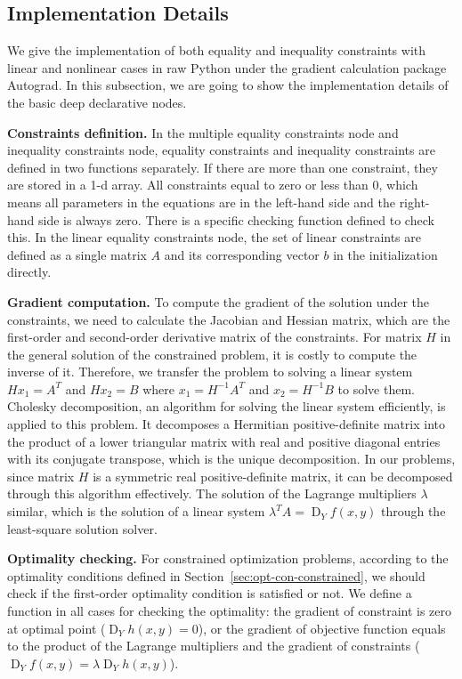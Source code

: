 \subsection{Implementation Details}
We give the implementation of both equality and inequality constraints with linear and nonlinear cases in raw Python under the gradient calculation package Autograd\citep{MD:15}. In this subsection, we are going to show the implementation details of the basic deep declarative nodes.
\par \textbf{Constraints definition.}  
In the multiple equality constraints node and inequality constraints node, equality constraints and inequality constraints are defined in two functions separately. If there are more than one constraint, they are stored in a 1-d array. All constraints equal to zero or less than 0, which means all parameters in the equations are in the left-hand side and the right-hand side is always zero. There is a specific checking function defined to check this. In the linear equality constraints node, the set of linear constraints are defined as a single matrix $A$ and its corresponding vector $b$ in the initialization directly. 

\par \textbf{Gradient computation.}
To compute the gradient of the solution under the constraints, we need to calculate the Jacobian and Hessian matrix, which are the first-order and second-order derivative matrix of the constraints. For matrix $H$ in the general solution of the constrained problem, it is costly to compute the inverse of it. Therefore, we transfer the problem to solving a linear system $Hx_1 = A^T$ and $Hx_2 = B$ where $x_1 = H^{-1}A^T$ and $x_2 = H^{-1}B$ to solve them. Cholesky decomposition, an algorithm for solving the linear system efficiently, is applied to this problem. It decomposes a Hermitian positive-definite matrix into the product of a lower triangular matrix with real and positive diagonal entries with its conjugate transpose, which is the unique decomposition. In our problems, since matrix $H$ is a symmetric real positive-definite matrix, it can be decomposed through this algorithm effectively. The solution of the Lagrange multipliers $\lambda$ similar, which is the solution of a linear system $\lambda^T A = \operatorname{D}_Yf(x,y)$ through the least-square solution solver. 
\par \textbf{Optimality checking.} For constrained optimization problems, according to the optimality conditions defined in Section~\ref{sec:opt-con-constrained}, we should check if the first-order optimality condition is satisfied or not. We define a function in all cases for checking the optimality: the gradient of constraint is zero at optimal point ($\operatorname{D}_Yh(x,y) = 0$), or the gradient of objective function equals to the product of the Lagrange multipliers and the gradient of constraints ($\operatorname{D}_Yf(x, y) = \lambda \operatorname{D}_Yh(x, y)$). 


